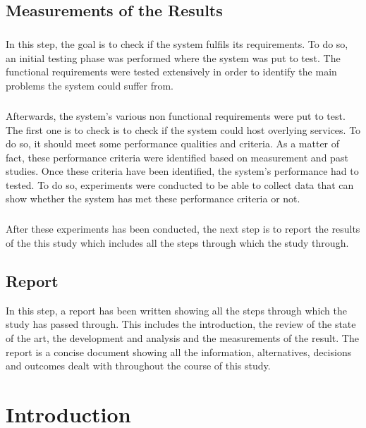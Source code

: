 \documentclass[12pt,a4paper,final]{report}
\begin{document}
\section{Measurements of the Results}
\paragraph{}
In this step, the goal is to check if the system fulfils its requirements. To do so, an initial testing phase was performed where the system was put to test. The functional requirements were tested extensively in order to identify the main problems the system could suffer from.
\paragraph{}
Afterwards, the system's various non functional requirements were put to test. The first one is to check is to check if the system could host overlying services. To do so, it should meet some performance qualities and criteria. As a matter of fact, these performance criteria were identified based on measurement and past studies. Once these criteria have been identified, the system's performance had to tested. To do so, experiments were conducted to be able to collect data that can show whether the system has met these performance criteria or not.
\paragraph{}
After these experiments has been conducted, the next step is to report the results of the this study which includes all the steps through which the study through.

\section{Report}
In this step, a report has been written showing all the steps through which the study has passed through. This includes the introduction, the review of the state of the art, the development and analysis and the measurements of the result. The report is a concise document showing all the information, alternatives, decisions and outcomes dealt with throughout the course of this study.

\chapter{Introduction}

\end{document}
